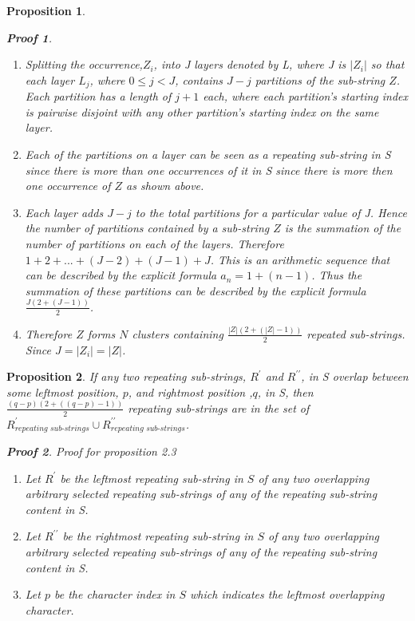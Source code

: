 \documentclass[12pt]{article}
\newtheorem{thm}{Proposition}[section]
\newtheorem{prf}{Proof}[section]
\begin{document}
\begin{flushleft}
\begin{thm}
\begin{prf}
\begin{enumerate}
				\item Splitting the occurrence,$Z_{i}$, into J layers denoted by L, where J is $|Z_{i}|$ so that each layer $L_{j}$, where $0 \leq j < J $, contains $J - j$ partitions of the sub-string $Z$. Each partition has a length of $j + 1$ each, where each partition's starting index is pairwise disjoint with any other partition's starting index on the same layer.
				\item Each of the partitions on a layer can be seen as a repeating sub-string in S since there is more than one occurrences of it in S since there is more then one occurrence of $Z$ as shown above. 
				\item Each layer adds $J - j$ to the total partitions for a particular value of J. Hence the number of partitions contained by a sub-string $Z$ is the summation of the number of partitions on each of the layers. Therefore $1 + 2 + ... + (J - 2) + (J - 1) + J$. This is an arithmetic sequence that can be described by the explicit formula $a_{n} = 1 + (n - 1)$. Thus the summation of these partitions can be described by the explicit formula $\frac{J(2 + (J-1))}{2}$. 
				\item Therefore $Z$ forms $N$ clusters containing $\frac{|Z|(2 + (|Z|-1))}{2}$ repeated sub-strings. Since $J = |Z_{i}| = |Z|$.		      
			\end{enumerate}
		\end{prf}	
	\end{thm}
	\newpage
	\begin{thm}
	If any two repeating sub-strings, $R^{\prime}$ and $R^{\prime\prime}$, in S overlap between some leftmost position, $p$, and rightmost position ,$q$, in S, then $\frac{(q - p)(2 + ((q - p)-1))}{2}$ repeating sub-strings are in the set of $R^{\prime}_{\textit{repeating sub-strings}} \cup R^{\prime\prime}_{\textit{repeating sub-strings}}$.
		\begin{prf} Proof for proposition 2.3
			\begin{enumerate}
				\item Let $R^{\prime}$ be the leftmost repeating sub-string in $S$ of any two overlapping arbitrary selected repeating sub-strings of any of the repeating sub-string content in S.  
				\item Let $R^{\prime\prime}$ be the rightmost repeating sub-string in $S$ of any two overlapping arbitrary selected repeating sub-strings of any of the repeating sub-string content in S.
				\item Let $p$ be the character index in $S$ which indicates the leftmost overlapping character.

\end{enumerate}
\end{prf}
\end{thm}
\end{flushleft}
\end{document}
